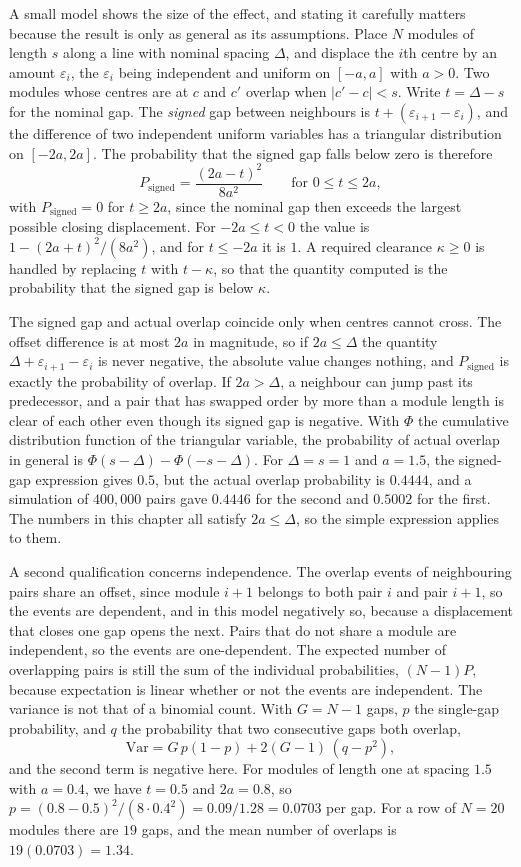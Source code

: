 A small model shows the size of the effect, and stating it carefully matters because the result is only as general as its assumptions. Place $N$ modules of length $s$ along a line with nominal spacing $\Delta$, and displace the $i$th centre by an amount $\varepsilon_i$, the $\varepsilon_i$ being independent and uniform on $[-a,a]$ with $a>0$. Two modules whose centres are at $c$ and $c'$ overlap when $|c'-c|<s$. Write $t=\Delta-s$ for the nominal gap. The \emph{signed} gap between neighbours is $t+(\varepsilon_{i+1}-\varepsilon_i)$, and the difference of two independent uniform variables has a triangular distribution on $[-2a,2a]$. The probability that the signed gap falls below zero is therefore
\[
  P_{\mathrm{signed}}=\frac{(2a-t)^2}{8a^2}\qquad\text{for }0\le t\le2a,
\]
with $P_{\mathrm{signed}}=0$ for $t\ge2a$, since the nominal gap then exceeds the largest possible closing displacement. For $-2a\le t<0$ the value is $1-(2a+t)^2/(8a^2)$, and for $t\le-2a$ it is $1$. A required clearance $\kappa\ge0$ is handled by replacing $t$ with $t-\kappa$, so that the quantity computed is the probability that the signed gap is below $\kappa$.

The signed gap and actual overlap coincide only when centres cannot cross. The offset difference is at most $2a$ in magnitude, so if $2a\le\Delta$ the quantity $\Delta+\varepsilon_{i+1}-\varepsilon_i$ is never negative, the absolute value changes nothing, and $P_{\mathrm{signed}}$ is exactly the probability of overlap. If $2a>\Delta$, a neighbour can jump past its predecessor, and a pair that has swapped order by more than a module length is clear of each other even though its signed gap is negative. With $\Phi$ the cumulative distribution function of the triangular variable, the probability of actual overlap in general is $\Phi(s-\Delta)-\Phi(-s-\Delta)$. For $\Delta=s=1$ and $a=1.5$, the signed-gap expression gives $0.5$, but the actual overlap probability is $0.4444$, and a simulation of $400{,}000$ pairs gave $0.4446$ for the second and $0.5002$ for the first. The numbers in this chapter all satisfy $2a\le\Delta$, so the simple expression applies to them.

A second qualification concerns independence. The overlap events of neighbouring pairs share an offset, since module $i+1$ belongs to both pair $i$ and pair $i+1$, so the events are dependent, and in this model negatively so, because a displacement that closes one gap opens the next. Pairs that do not share a module are independent, so the events are one-dependent. The expected number of overlapping pairs is still the sum of the individual probabilities, $(N-1)P$, because expectation is linear whether or not the events are independent. The variance is not that of a binomial count. With $G=N-1$ gaps, $p$ the single-gap probability, and $q$ the probability that two consecutive gaps both overlap,
\[
  \mathrm{Var}=G\,p(1-p)+2(G-1)\,(q-p^2),
\]
and the second term is negative here. For modules of length one at spacing $1.5$ with $a=0.4$, we have $t=0.5$ and $2a=0.8$, so $p=(0.8-0.5)^2/(8\cdot0.4^2)=0.09/1.28=0.0703$ per gap. For a row of $N=20$ modules there are $19$ gaps, and the mean number of overlaps is $19(0.0703)=1.34$.

